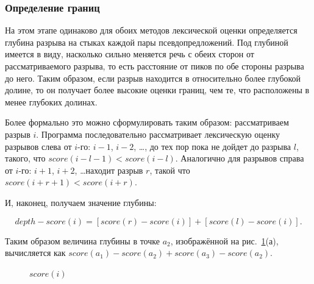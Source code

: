 \documentclass[14pt]{matmex-diploma-custom}
\begin{document}
\subsubsection{Определение границ}
На этом этапе одинаково для обоих методов лексической оценки определяется глубина разрыва на стыках каждой пары псевдопредложений. Под глубиной имеется в виду, насколько сильно меняется речь с обеих сторон от рассматриваемого разрыва, то есть расстояние от пиков по обе стороны разрыва до него. Таким образом, если разрыв находится в относительно более глубокой долине, то он получает более высокие оценки границ, чем те, что расположены в менее глубоких долинах. 

Более формально это можно сформулировать таким образом: рассматриваем разрыв $i$. Программа последовательно рассматривает лексическую оценку разрывов слева от $i$-го: $i-1$, $i-2$, \ldots, до тех пор пока не дойдет до разрыва $l$, такого, что $score(i-l-1) < score(i-l)$. Аналогично для разрывов справа от $i$-го: $i+1$, $i+2$, \ldots находит разрыв $r$, такой что $score(i+r+1) < score(i+r)$. 

И, наконец, получаем значение глубины: 
\vspace{-35pt}
\begin{center}
	$$depth-score(i) = [score(r) - score(i)] + [score(l) - score(i)].$$
\end{center}

Таким образом величина глубины в точке $a_2$, изображённой на \linebreak рис.~\ref{im3}(а), вычисляется как $score(a_1) - score(a_2) + score(a_3) - score(a_2)$.

\vspace{5pt}
\begin{figure}[h!]
	\caption{$score(i)$}
	\label{im3}
\end{figure}
\vspace{5pt}
\end{document}
